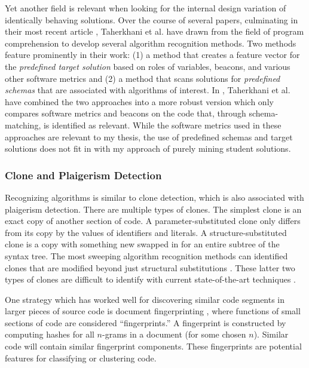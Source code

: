\documentclass[12pt]{article}
\begin{document}
Yet another field is relevant when looking for the internal design variation of identically behaving solutions. Over the course of several papers, culminating in their most recent article \cite{taherkhani13}, Taherkhani et al. have drawn from the field of program comprehension to develop several algorithm recognition methods. Two methods feature prominently in their work: (1) a method that creates a feature vector for the \emph{predefined target solution} based on roles of variables, beacons, and various other software metrics and (2) a method that scans solutions for \emph{predefined schemas} that are associated with algorithms of interest. In \cite{taherkhani13}, Taherkhani et al. have combined the two approaches into a more robust version which only compares software metrics and beacons on the code that, through schema-matching, is identified as relevant. While the software metrics used in these approaches are relevant to my thesis, the use of predefined schemas and target solutions does not fit in with my approach of purely mining student solutions.

\subsubsection{Clone and Plaigerism Detection}

Recognizing algorithms is similar to clone detection, which is also associated with plaigerism detection. There are multiple types of clones. The simplest clone is an exact copy of another section of code. A parameter-substituted clone only differs from its copy by the values of identifiers and literals. A structure-substituted clone is a copy with something new swapped in for an entire subtree of the syntax tree. The most sweeping algorithm recognition methods can identified clones that are modified beyond just structural substitutions \cite{tiarks2011extended}. These latter two types of clones are difficult to identify with current state-of-the-art techniques \cite{taherkhani12, taherkhani13}. 

One strategy which has worked well for discovering similar code segments in larger pieces of source code is document fingerprinting \cite{schleimer2003winnowing}, where functions of small sections of code are considered ``fingerprints.'' A fingerprint is constructed by computing hashes for all $n$-grams in a document (for some chosen $n$). Similar code will contain similar fingerprint components. These fingerprints are potential features for classifying or clustering code.
\end{document}
